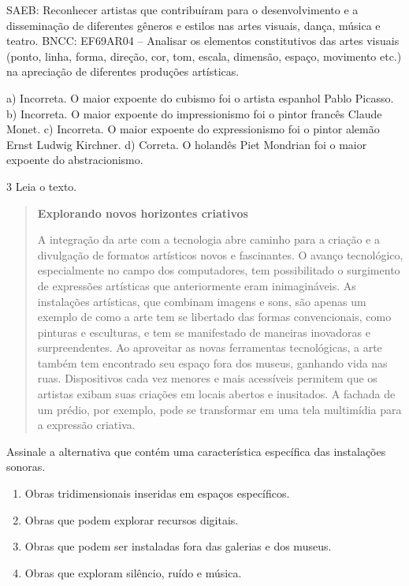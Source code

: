 SAEB: Reconhecer artistas que contribuíram para o desenvolvimento e a
disseminação de diferentes gêneros e estilos nas artes visuais, dança,
música e teatro.
BNCC: EF69AR04 -- Analisar os elementos constitutivos das artes visuais
(ponto, linha, forma, direção, cor, tom, escala, dimensão, espaço,
movimento etc.) na apreciação de diferentes produções artísticas.

a) Incorreta. O maior expoente do cubismo foi o artista espanhol Pablo Picasso.
b) Incorreta. O maior expoente do impressionismo foi o pintor francês Claude Monet.
c) Incorreta. O maior expoente do expressionismo foi o pintor alemão Ernst Ludwig Kirchner.
d) Correta. O holandês Piet Mondrian foi o maior expoente do abstracionismo.

\num{3} Leia o texto.

\begin{quote}
\textbf{Explorando novos horizontes criativos}

A integração da arte com a tecnologia abre caminho para a criação e a divulgação de formatos artísticos 
novos e fascinantes. O avanço tecnológico, especialmente no campo dos computadores, tem possibilitado o 
surgimento de expressões artísticas que anteriormente eram inimagináveis. As instalações artísticas, que 
combinam imagens e sons, são apenas um exemplo de como a arte tem se libertado das formas convencionais, 
como pinturas e esculturas, e tem se manifestado de maneiras inovadoras e surpreendentes. Ao aproveitar as 
novas ferramentas tecnológicas, a arte também tem encontrado seu espaço fora dos museus, ganhando vida nas 
ruas. Dispositivos cada vez menores e mais acessíveis permitem que os artistas exibam suas criações em 
locais abertos e inusitados. A fachada de um prédio, por exemplo, pode se transformar em uma tela 
multimídia para a expressão criativa.

\end{quote}

Assinale a alternativa que contém uma característica específica das
instalações sonoras.

\begin{enumerate}
\def\labelenumi{\alph{enumi})}
\item
  Obras tridimensionais inseridas em espaços específicos.
\item
  Obras que podem explorar recursos digitais.
\item
  Obras que podem ser instaladas fora das galerias e dos museus.
\item
  Obras que exploram silêncio, ruído e música.
\end{enumerate}

